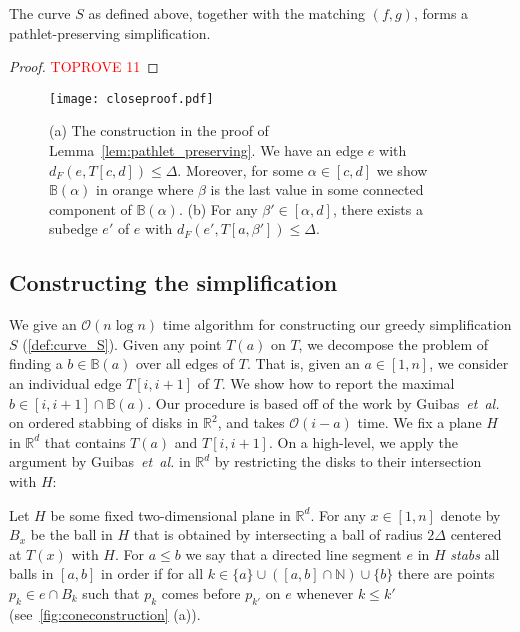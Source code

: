 \documentclass[a4paper,UKenglish,cleveref,thm-restate,notab]{lipics-v2021}
\makeatletter
\newcommand{\etal}{\textit{et~al.\@}\xspace}
\newcommand{\dF}{\ensuremath{d_F}}
\newcommand{\bigO}{\mathcal{O}}
\newcommand{\R}{\mathbb{R}}
\newcommand{\N}{\mathbb{N}}
\newcommand{\B}{\mathbb{B}}
\makeatother
\begin{document}
    \begin{lemma}
    \label{lem:pathlet_preserving}
     The curve $S$ as defined above, together with the matching $(f, g)$, forms a pathlet-preserving simplification. 
    \end{lemma}
    \begin{proof}\textcolor{red}{TOPROVE 11}\end{proof}
    
    \begin{figure}[h]
        \centering
        \texttt{[image: closeproof.pdf]}
        \caption{(a) The construction in the proof of Lemma~\ref{lem:pathlet_preserving}.
        We have an edge $e$ with $\dF(e, T[c, d]) \leq \Delta$. Moreover, for some $\alpha \in [c, d]$ we show $\B(\alpha)$ in orange where $\beta$ is the last value in some connected component of $\B(\alpha)$. (b) For any $\beta' \in [\alpha, d]$, there exists a subedge $e'$ of $e$ with $\dF(e', T[a, \beta']) \leq \Delta$.  }
        \label{fig:closeproof}
    \end{figure}
        
\subsection{Constructing the simplification}
        
    We give an $\bigO(n \log n)$ time algorithm for constructing our greedy simplification $S$ (\cref{def:curve_S}).
    Given any point $T(a)$ on $T$, we decompose the problem of finding a $b \in \B(a)$ over all edges of $T$.
    That is, given an $a \in [1, n]$, we consider an individual edge $T[i, i+1]$ of $T$. 
    We show how to report the maximal $b \in [i, i+1] \cap \B(a)$.
    Our procedure is based off of the work by Guibas~\etal~\cite{guibas93minimum_link} on ordered stabbing of disks in $\mathbb{R}^2$, and takes $\bigO(i-a)$ time.
    We fix a plane $H$ in $\R^d$ that contains $T(a)$ and $T[i, i+1]$. 
    On a high-level, we apply the argument by Guibas~\etal in $\R^d$ by restricting the disks to their intersection with $H$: 
    
    \begin{definition}
        Let $H$ be some fixed two-dimensional plane in $\R^d$. 
        For any $x \in [1, n]$ denote by $B_x$ be the ball in $H$ that is obtained by intersecting a ball of radius $2\Delta$ centered at $T(x)$ with $H$.
        For $a \leq b$ we say that a directed line segment $e$ in $H$ \emph{stabs} all balls in $[a, b]$ in order if for all $k \in \{a\} \cup ([a, b] \cap \N) \cup \{b\}$ there are points $p_k \in e \cap B_k$ such that $p_k$ comes before $p_{k'}$ on $e$ whenever $k \leq k'$ (see~\cref{fig:coneconstruction} (a)). 
    \end{definition}
    
\end{document}
